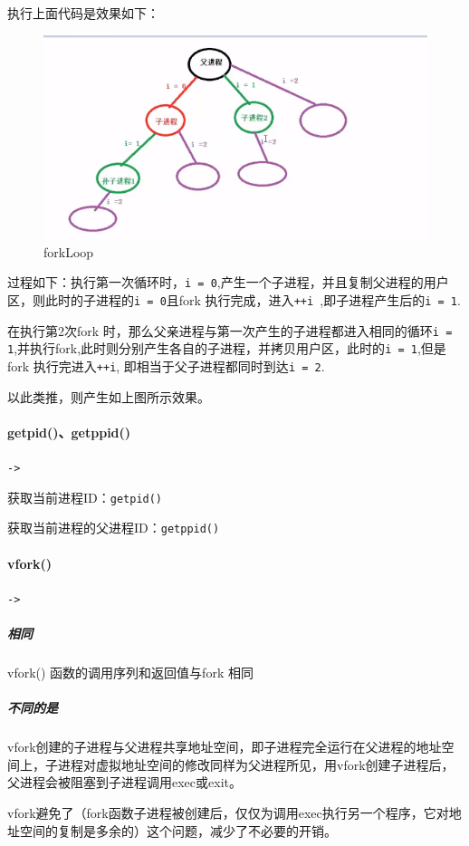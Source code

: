 \documentclass[UTF8,a4paper,12pt]{ctexbook}
\begin{document}
				执行上面代码是效果如下：
					\begin{figure}[H]
						\centering
						\includegraphics[scale=0.6]{forkLoop.png}
						\caption{forkLoop}
					\end{figure}
					
				过程如下：执行第一次循环时，\verb|i = 0|,产生一个子进程，并且复制父进程的用户区，则此时的子进程的\verb|i = 0|且fork 执行完成，进入\verb|++i |,即子进程产生后的\verb|i = 1|.
				
				在执行第2次fork 时，那么父亲进程与第一次产生的子进程都进入相同的循环\verb|i = 1|,并执行fork,此时则分别产生各自的子进程，并拷贝用户区，此时的\verb|i = 1|,但是fork 执行完进入\verb|++i|, 即相当于父子进程都同时到达\verb|i = 2|.
				
				以此类推，则产生如上图所示效果。	
				
			\paragraph{getpid()、getppid()}\verb|->|
			
				获取当前进程ID：\verb|getpid()|
				
				获取当前进程的父进程ID：\verb|getppid()|	
		
			\paragraph{vfork()}\verb|->|
				
				\subparagraph{相同} vfork() 函数的调用序列和返回值与fork 相同
				
				\subparagraph{不同的是} vfork创建的子进程与父进程共享地址空间，即子进程完全运行在父进程的地址空间上，子进程对虚拟地址空间的修改同样为父进程所见，用vfork创建子进程后，父进程会被阻塞到子进程调用exec或exit。
				
				vfork避免了（fork函数子进程被创建后，仅仅为调用exec执行另一个程序，它对地址空间的复制是多余的）这个问题，减少了不必要的开销。
				
\end{document}
